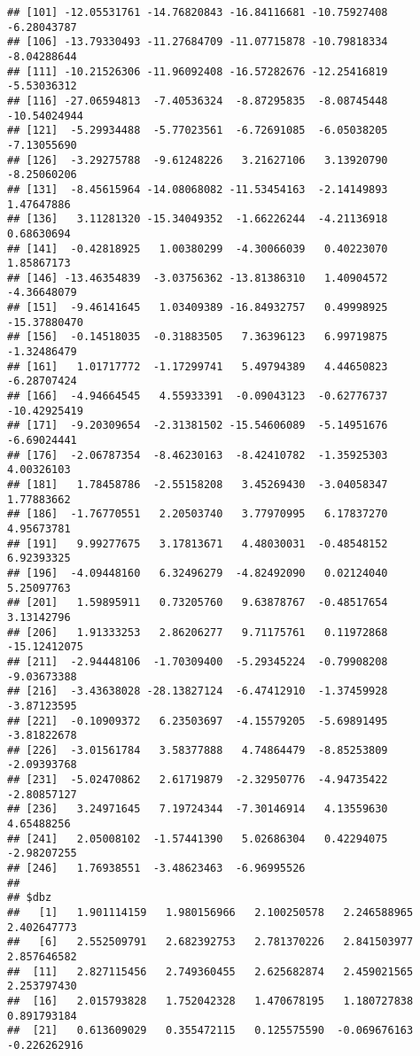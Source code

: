 \documentclass[
]{article}
\begin{document}
\begin{verbatim}
## [101] -12.05531761 -14.76820843 -16.84116681 -10.75927408  -6.28043787
## [106] -13.79330493 -11.27684709 -11.07715878 -10.79818334  -8.04288644
## [111] -10.21526306 -11.96092408 -16.57282676 -12.25416819  -5.53036312
## [116] -27.06594813  -7.40536324  -8.87295835  -8.08745448 -10.54024944
## [121]  -5.29934488  -5.77023561  -6.72691085  -6.05038205  -7.13055690
## [126]  -3.29275788  -9.61248226   3.21627106   3.13920790  -8.25060206
## [131]  -8.45615964 -14.08068082 -11.53454163  -2.14149893   1.47647886
## [136]   3.11281320 -15.34049352  -1.66226244  -4.21136918   0.68630694
## [141]  -0.42818925   1.00380299  -4.30066039   0.40223070   1.85867173
## [146] -13.46354839  -3.03756362 -13.81386310   1.40904572  -4.36648079
## [151]  -9.46141645   1.03409389 -16.84932757   0.49998925 -15.37880470
## [156]  -0.14518035  -0.31883505   7.36396123   6.99719875  -1.32486479
## [161]   1.01717772  -1.17299741   5.49794389   4.44650823  -6.28707424
## [166]  -4.94664545   4.55933391  -0.09043123  -0.62776737 -10.42925419
## [171]  -9.20309654  -2.31381502 -15.54606089  -5.14951676  -6.69024441
## [176]  -2.06787354  -8.46230163  -8.42410782  -1.35925303   4.00326103
## [181]   1.78458786  -2.55158208   3.45269430  -3.04058347   1.77883662
## [186]  -1.76770551   2.20503740   3.77970995   6.17837270   4.95673781
## [191]   9.99277675   3.17813671   4.48030031  -0.48548152   6.92393325
## [196]  -4.09448160   6.32496279  -4.82492090   0.02124040   5.25097763
## [201]   1.59895911   0.73205760   9.63878767  -0.48517654   3.13142796
## [206]   1.91333253   2.86206277   9.71175761   0.11972868 -15.12412075
## [211]  -2.94448106  -1.70309400  -5.29345224  -0.79908208  -9.03673388
## [216]  -3.43638028 -28.13827124  -6.47412910  -1.37459928  -3.87123595
## [221]  -0.10909372   6.23503697  -4.15579205  -5.69891495  -3.81822678
## [226]  -3.01561784   3.58377888   4.74864479  -8.85253809  -2.09393768
## [231]  -5.02470862   2.61719879  -2.32950776  -4.94735422  -2.80857127
## [236]   3.24971645   7.19724344  -7.30146914   4.13559630   4.65488256
## [241]   2.05008102  -1.57441390   5.02686304   0.42294075  -2.98207255
## [246]   1.76938551  -3.48623463  -6.96995526
## 
## $dbz
##   [1]   1.901114159   1.980156966   2.100250578   2.246588965   2.402647773
##   [6]   2.552509791   2.682392753   2.781370226   2.841503977   2.857646582
##  [11]   2.827115456   2.749360455   2.625682874   2.459021565   2.253797430
##  [16]   2.015793828   1.752042328   1.470678195   1.180727838   0.891793184
##  [21]   0.613609029   0.355472115   0.125575590  -0.069676163  -0.226262916

\end{verbatim}
\end{document}
